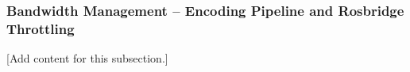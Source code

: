 
\subsubsection{Bandwidth Management -- Encoding Pipeline and Rosbridge Throttling}
\label{subsubsec:design_2_3_6_bandwidth_management}

[Add content for this subsection.]
